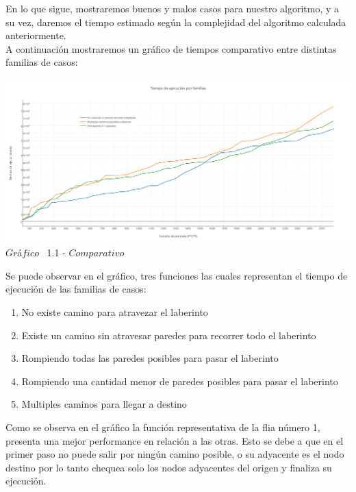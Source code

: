 \indent En lo que sigue, mostraremos buenos y malos casos para nuestro algoritmo, y a su vez, daremos el tiempo estimado 
seg\'un la complejidad del algoritmo calculada anteriormente.\\


A continuaci\'on mostraremos un gr\'afico de tiempos comparativo entre distintas familias de casos:\\ 

\vspace*{0.3cm} \vspace*{0.3cm}
  \begin{center}
 \includegraphics[scale=0.4]{./EJ1/comparativo.png}
 {            $Gr$\'a$fico$ \ 1.1 - $Comparativo$}
  \end{center}
  \vspace*{0.3cm}
  
Se puede observar en el gr\'afico, tres funciones las cuales representan el tiempo de ejecuci\'on de las familias de casos:\\
\begin{enumerate}
\item No existe camino para atravezar el laberinto
\item Existe un camino sin atravesar paredes para recorrer todo el laberinto
\item Rompiendo todas las paredes posibles para pasar el laberinto
\item Rompiendo una cantidad menor de paredes posibles para pasar el laberinto
\item Multiples caminos para llegar a destino
\end{enumerate}



Como se observa en el gr\'afico la funci\'on representativa de la flia n\'umero 1, presenta una mejor performance en relaci\'on a las otras. Esto se debe a que en el primer paso no puede salir por ning\'un camino posible, o su adyacente es el nodo destino por lo tanto chequea solo los nodos adyacentes del origen y finaliza su ejecuci\'on.

